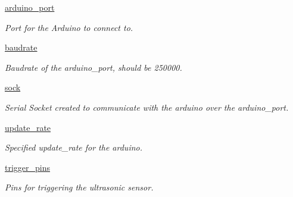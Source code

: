 \begin{DoxyCompactItemize}
\item 
\mbox{\label{class_sensor_app_1_1_sensor_app_a888dda7b7c27cafa37ed670114bf1c9b}} 
\mbox{\hyperlink{class_sensor_app_1_1_sensor_app_a888dda7b7c27cafa37ed670114bf1c9b}{arduino\+\_\+port}}
\begin{DoxyCompactList}\small\item\em Port for the Arduino to connect to. \end{DoxyCompactList}\item 
\mbox{\label{class_sensor_app_1_1_sensor_app_a63cf06625f46bb3ac62bead94d06f2b4}} 
\mbox{\hyperlink{class_sensor_app_1_1_sensor_app_a63cf06625f46bb3ac62bead94d06f2b4}{baudrate}}
\begin{DoxyCompactList}\small\item\em Baudrate of the arduino\+\_\+port, should be 250000. \end{DoxyCompactList}\item 
\mbox{\label{class_sensor_app_1_1_sensor_app_aef6da161ddb54a90905a9cb8d793d9de}} 
\mbox{\hyperlink{class_sensor_app_1_1_sensor_app_aef6da161ddb54a90905a9cb8d793d9de}{sock}}
\begin{DoxyCompactList}\small\item\em Serial Socket created to communicate with the arduino over the arduino\+\_\+port. \end{DoxyCompactList}\item 
\mbox{\label{class_sensor_app_1_1_sensor_app_ad6dfe39d8eb808d881f5a4f76f1b38ac}} 
\mbox{\hyperlink{class_sensor_app_1_1_sensor_app_ad6dfe39d8eb808d881f5a4f76f1b38ac}{update\+\_\+rate}}
\begin{DoxyCompactList}\small\item\em Specified update\+\_\+rate for the arduino. \end{DoxyCompactList}\item 
\mbox{\label{class_sensor_app_1_1_sensor_app_a657c2112bb07280d3249eb1f1899affd}} 
\mbox{\hyperlink{class_sensor_app_1_1_sensor_app_a657c2112bb07280d3249eb1f1899affd}{trigger\+\_\+pins}}
\begin{DoxyCompactList}\small\item\em Pins for triggering the ultrasonic sensor. \end{DoxyCompactList}\item 

\end{DoxyCompactItemize}
